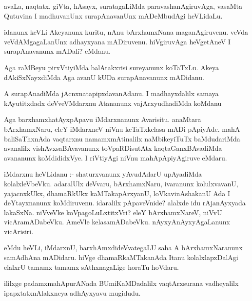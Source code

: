 \documentclass{article}
\begin{document}
\begin{mn}
avaLa, naqtatx, giVta, hAsayx, suratagaLiMda paravashanAgiruvAga,  vasaMta Qutuvina 
I madhuvanUnx surapAnavanUnx mADeMbudAgi heVLidaLu.
\end{mn}

\begin{mn}
idanunx keVLi Akeyanunx kuritu, nAnu bArxhamxNana maganAgiruvenu.  veVda veVdAMgagaLanUnx 
 adhayxyana mADiruvenu.  hiVgiruvAga  heVgetAneV I surapAnavanunx mADali? eMdanu.
\end{mn}

\begin{mn}
Aga raMBeyu pirxVtiyiMda balAtakxrisi  sureyanunx koTaTxLu. Akeya 
dAkiSxNayxdiMda Aga avanU kUDa surapAnavanunx mADidanu.
\end{mn}

\begin{mn}
A surapAnadiMda  jAcnxnatapipxdavanAdanu.  I  madhayxdalilx samaya kAyutitxdadx  
deVveVMdarxnu Atananunx vajArxyudhadiMda koMdanu
\end{mn}

\begin{mn}
Aga barxhamxhatAyxpApavu iMdarxnanunx  Avarisitu.  anaMtara  bArxhamxNaru,  
eleY iMdarxneV niVnu keTaTxkelasa mADi pApiyAde.  mahA baliSaThxnAda vaqtarxnu 
namamxmAtinalilx naMbikeyiTuTx  baMdudariMda  avanalilx vishAvxsaBAvavanunx  
toVpaRDisutAtx  kaqtaGanxBAvadiMda  avananunx  koMdididxVye.  I riVtiyAgi  
niVnu mahApApiyAgiruve eMdaru.
\end{mn}

\begin{mn}
iMdarxnu heVLidanu :- shaturxvanunx yAvudAdarU upAyadiMda  kolalxleVbeVku.  
adaralUlx deVvaru,  bArxhamxNaru,  ivaranunx kolulxvavanU, yajacnxkUkx, 
dhamaRkUkx  kaMTakapArxyanU,  loVkavinAshakanU  Ada I deYtayxnanunx koMdiruvenu.  
idaralilx pApaveVnide?  alalxde  idu rAjanAyxyada lakaSxNa.  niVveVke 
koVpagoLuLxtitxVri?  eleY  bArxhamxNareV, niVvU vicAramADabeVku.  AmeVle 
kelasamADabeVku.  nAyxyAnAyxyAgaLanunx  vicArisiri.
\end{mn}

\begin{mn}
eMdu heVLi, iMdarxnU, barxhAmxdideVvategaLU saha A bArxhamxNaranunx  
samAdhAna mADidaru.  hiVge  dhamaRkaMTakanAda Itanu kolalxlapxDalAgi 
elalxrU tamamx tamamx sAthxnagaLige  horaTu hoVdaru.
\end{mn}

\begin{mn}
ililxge padamxmahApurANada BUmiKaMDadalilx  vaqtArxsurana vadheyalilx 
ipapxtatxnAlakxneya  adhAyxyavu mugidudu.
\end{mn}
\end{document}
